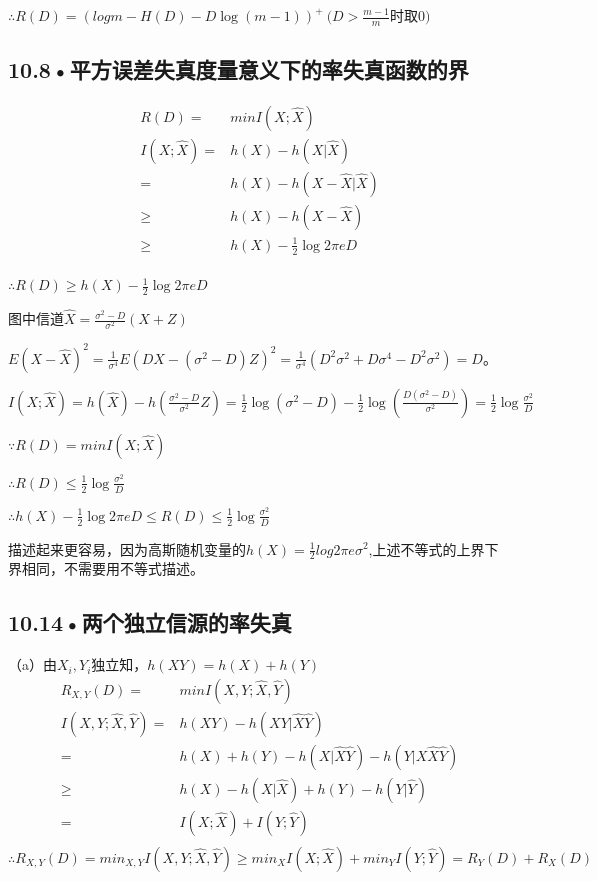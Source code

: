 \documentclass[UTF8]{ctexart}
\begin{document}
$\therefore R(D)=(log m - H(D) - D\log(m-1))^+\ (D>\frac{m-1}{m}$时取0$)$
\subsection*{10.8•平方误差失真度量意义下的率失真函数的界}
\begin{equation*}
    \begin{split}
        R(D)=& min I(X;\hat{X})\\
        I(X;\hat{X})=& h(X) - h(X|\hat{X})\\
            =& h(X) - h(X-\hat{X}|\hat{X})\\
            \geqslant & h(X) - h(X-\hat{X})\\
            \geqslant & h(X) - \frac{1}{2}\log 2\pi e D\\
    \end{split}
\end{equation*}

$\therefore R(D)\geqslant h(X) - \frac{1}{2}\log 2\pi e D$

图中信道$\hat{X}=\frac{\sigma^2-D}{\sigma^2}(X+Z)$

$E(X-\hat{X})^2=\frac{1}{\sigma^4}E(DX - (\sigma^2 - D)Z)^2 = \frac{1}{\sigma^4}(D^2\sigma^2 +D\sigma^4 -D^2\sigma^2)=D$。

$I(X;\hat{X})=h(\hat{X})-h(\frac{\sigma^2-D}{\sigma^2}Z)=\frac{1}{2}\log (\sigma^2-D)-\frac{1}{2}\log (\frac{D(\sigma^2-D)}{\sigma^2})=\frac{1}{2}\log \frac{\sigma^2}{D}$

$\because R(D)=min I(X;\hat{X})$

$\therefore R(D)\leqslant \frac{1}{2}\log \frac{\sigma^2}{D}$

$\therefore h(X) - \frac{1}{2}\log 2\pi e D\leqslant R(D)\leqslant \frac{1}{2}\log \frac{\sigma^2}{D}$


描述起来更容易，因为高斯随机变量的$h(X)=\frac{1}{2}log2\pi e\sigma^2$,上述不等式的上界下界相同，不需要用不等式描述。
\subsection*{10.14•两个独立信源的率失真}
（a）由$X_i, Y_i$独立知，$h(XY)=h(X)+h(Y)$
\begin{equation*}
    \begin{split}
        R_{X,Y}(D)=& min I(X,Y;\hat{X},\hat{Y})\\
        I(X,Y;\hat{X},\hat{Y})=& h(XY) - h(XY|\hat{X}\hat{Y})\\
            =& h(X)+h(Y) - h(X|\hat{X}\hat{Y})-h(Y|X\hat{X}\hat{Y})\\
            \geqslant & h(X) - h(X|\hat{X})+h(Y) - h(Y|\hat{Y})\\
            =& I(X;\hat{X})+I(Y;\hat{Y})\\
    \end{split}
\end{equation*}
$\therefore R_{X,Y}(D)=min_{X,Y} I(X,Y;\hat{X},\hat{Y})\geqslant min_X I(X;\hat{X})+ min_YI(Y;\hat{Y})=R_Y(D)+R_X(D)$
\end{document}
